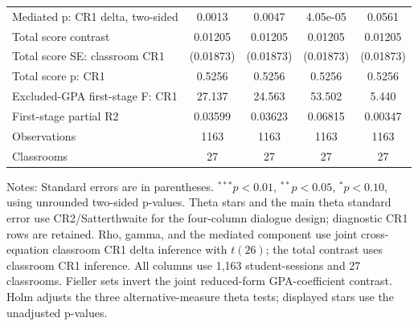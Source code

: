 \begin{table}[htbp]
{\begin{tabular}{lcccc}
Mediated p: CR1 delta, two-sided & 0.0013 & 0.0047 & 4.05e-05 & 0.0561 \\
Total score contrast & 0.01205 & 0.01205 & 0.01205 & 0.01205 \\
Total score SE: classroom CR1 & (0.01873) & (0.01873) & (0.01873) & (0.01873) \\
Total score p: CR1 & 0.5256 & 0.5256 & 0.5256 & 0.5256 \\
Excluded-GPA first-stage F: CR1 & 27.137 & 24.563 & 53.502 & 5.440 \\
First-stage partial R2 & 0.03599 & 0.03623 & 0.06815 & 0.00347 \\
Observations & 1163 & 1163 & 1163 & 1163 \\
Classrooms & 27 & 27 & 27 & 27 \\
\hline
\end{tabular}}
\endgroup
\par\medskip
\parbox{\linewidth}{\footnotesize Notes: Standard errors are in parentheses. $^{***}p<0.01$, $^{**}p<0.05$, $^{*}p<0.10$, using unrounded two-sided p-values. Theta stars and the main theta standard error use CR2/Satterthwaite for the four-column dialogue design; diagnostic CR1 rows are retained. Rho, gamma, and the mediated component use joint cross-equation classroom CR1 delta inference with $t(26)$; the total contrast uses classroom CR1 inference. All columns use 1,163 student-sessions and 27 classrooms. Fieller sets invert the joint reduced-form GPA-coefficient contrast. Holm adjusts the three alternative-measure theta tests; displayed stars use the unadjusted p-values.}
\end{table}
